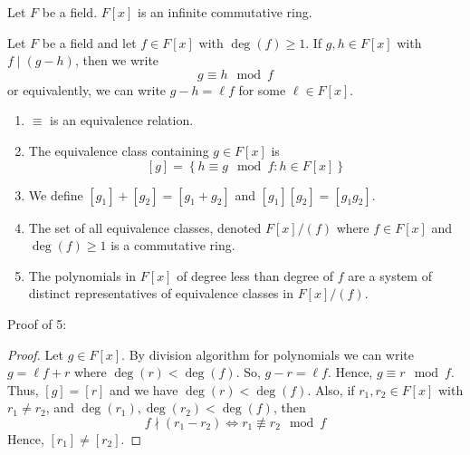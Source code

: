 \begin{thmbox}
    \begin{theorem}
    Let $ F $ be a field. $ F[x] $ is an infinite commutative ring.
\end{theorem} \end{thmbox}

\begin{defbox}
    \begin{definition}
    Let $ F $ be a field and let $ f\in F[x] $ with $ \deg(f)\geqslant 1 $.
    If $ g,h\in F[x] $ with $ f\mid (g-h) $, then we write
    \[ g\equiv h \mod f \]
    or equivalently, we can write $ g-h=\ell f $ for some $ \ell\in F[x] $.
\end{definition} \end{defbox}

\begin{thmbox}
    \begin{theorem}
    \begin{enumerate}[1.]
        \item $ \equiv $ is an equivalence relation.
        \item The equivalence class containing $ g\in F[x] $ is
        \[ [g]=\left\{ h\equiv g\mod f: h\in F[x]\right\} \]
        \item We define $ [g_1]+[g_2]=[g_1+g_2] $ and $ [g_1][g_2]=[g_1g_2] $.
        \item The set of all equivalence classes, denoted $ F[x]/(f) $ 
        where $ f\in F[x] $ and $ \deg(f)\geqslant 1 $ is a
        commutative ring.
        \item The polynomials in $ F[x] $ of degree less than degree of $ f $
        are a system of distinct representatives of equivalence classes in
        $ F[x]/(f)$.
    \end{enumerate}
\end{theorem} \end{thmbox}
Proof of 5:
\begin{proof}
    Let $ g\in F[x] $. By division algorithm for polynomials we can write
    $ g=\ell f+r $ where $ \deg(r)<\deg(f) $. So, $ g-r=\ell f $. Hence,
    $ g\equiv r\mod f $. Thus, $ [g]=[r] $ and we have $ \deg(r)<\deg(f) $.
    Also, if $ r_1,r_2\in F[x] $ with $ r_1\neq r_2 $, and
    $ \deg(r_1),\deg(r_2)<\deg(f) $, then
    \[ f\nmid (r_1-r_2)\iff r_1\not\equiv r_2\mod f \]
    Hence, $ [r_1]\neq [r_2] $.
\end{proof}